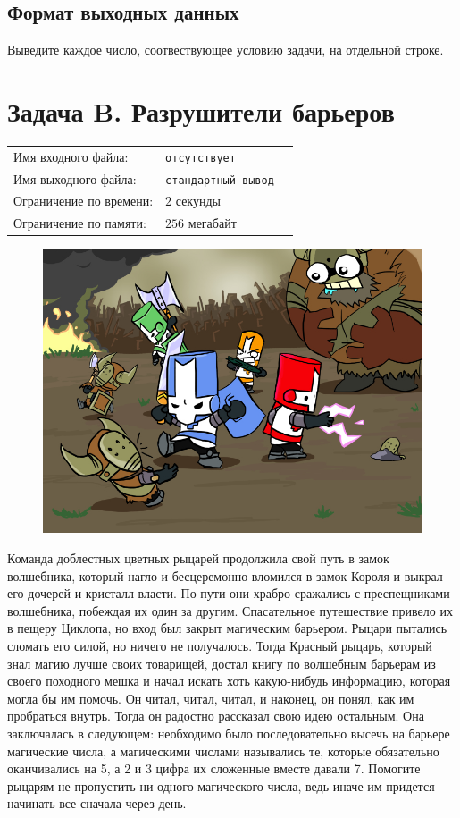 \documentclass[12pt]{scrartcl}
\newcommand{\inputFile}{отсутствует}
\newcommand{\outputFile}{стандартный вывод}
\begin{document}
\subsection*{Формат выходных данных}
Выведите каждое число, соотвествующее условию задачи, на отдельной строке.

\newpage

\section*{Задача B. Разрушители барьеров}

\begin{tabularx}{\textwidth}{l l X}
    Имя входного файла: & \texttt{\inputFile} \\
    Имя выходного файла: & \texttt{\outputFile} \\
    Ограничение по времени: & $2$ секунды \\
    Ограничение по памяти: & $256$ мегабайт \\
\end{tabularx}

\begin{figure}[h]
	\centering
    \includegraphics[width=0.6\linewidth]{Crashers2}
\end{figure}

Команда доблестных цветных рыцарей продолжила свой путь в замок волшебника, который нагло и бесцеремонно вломился в замок Короля и выкрал его дочерей и кристалл власти. 
По пути они храбро сражались с преспещниками волшебника, побеждая их один за другим. Спасательное путешествие привело их в пещеру Циклопа, но вход был закрыт магическим барьером.
Рыцари пытались сломать его силой, но ничего не получалось. Тогда Красный рыцарь, который знал магию лучше своих товарищей, достал книгу по волшебным барьерам из своего походного мешка и  
начал искать хоть какую-нибудь информацию, которая могла бы им помочь. Он читал, читал, читал, и наконец, он понял, как им пробраться внутрь. Тогда он радостно рассказал свою идею остальным.
Она заключалась в следующем: необходимо было последовательно высечь на барьере магические числа, а магическими числами назывались те, которые обязательно оканчивались на 5, а 2 и 3 цифра их сложенные вместе давали 7. 
Помогите рыцарям не пропустить ни одного магического числа, ведь иначе им придется начинать все сначала через день. 
\end{document}

